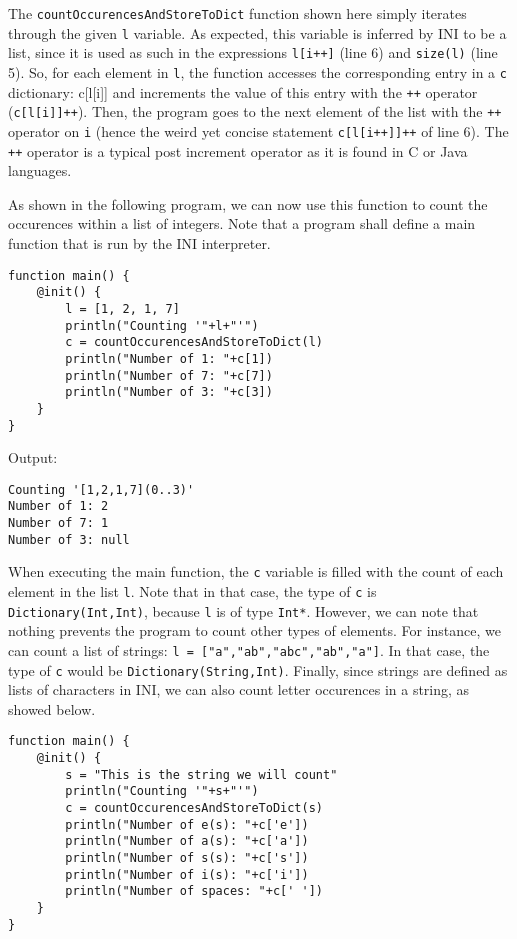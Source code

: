 \documentclass[11pt]{report}
\begin{document}
The \texttt{countOccurencesAndStoreToDict} function shown here simply iterates through the given \texttt{l} variable. As expected, this variable is inferred by INI to be a list, since it is used as such in the expressions \texttt{l[i++]} (line 6) and \texttt{size(l)} (line 5). So, for each element in \texttt{l}, the function accesses the corresponding entry in a \texttt{c} dictionary: c[l[i]] and increments the value of this entry with the \texttt{++} operator (\texttt{c[l[i]]++}). Then, the program goes to the next element of the list with the \texttt{++} operator on \texttt{i} (hence the weird yet concise statement \texttt{c[l[i++]]++} of line 6). The \texttt{++} operator is a typical post increment operator as it is found in C or Java languages.

As shown in the following program, we can now use this function to count the occurences within a list of integers. Note that a program shall define a main function that is run by the INI interpreter.

\begin{lstlisting}
function main() {
	@init() {
		l = [1, 2, 1, 7]
		println("Counting '"+l+"'")
		c = countOccurencesAndStoreToDict(l)
		println("Number of 1: "+c[1])
		println("Number of 7: "+c[7])
		println("Number of 3: "+c[3])
	}
}
\end{lstlisting}

Output:

\begin{lstlisting}[numbers=none]
Counting '[1,2,1,7](0..3)'
Number of 1: 2
Number of 7: 1
Number of 3: null
\end{lstlisting}

When executing the main function, the \texttt{c} variable is filled with the count of each element in the list \texttt{l}. Note that in that case, the type of \texttt{c} is \texttt{Dictionary(Int,Int)}, because \texttt{l} is of type \texttt{Int*}. However, we can note that nothing prevents the program to count other types of elements. For instance, we can count a list of strings: \texttt{l = ["a","ab","abc","ab","a"]}. In that case, the type of \texttt{c} would be \texttt{Dictionary(String,Int)}. Finally, since strings are defined as lists of characters in INI, we can also count letter occurences in a string, as showed below.

\begin{lstlisting}
function main() {
	@init() {
		s = "This is the string we will count"
		println("Counting '"+s+"'")
		c = countOccurencesAndStoreToDict(s)
		println("Number of e(s): "+c['e'])
		println("Number of a(s): "+c['a'])
		println("Number of s(s): "+c['s'])
		println("Number of i(s): "+c['i'])
		println("Number of spaces: "+c[' '])
	}
}
\end{lstlisting}
\end{document}
